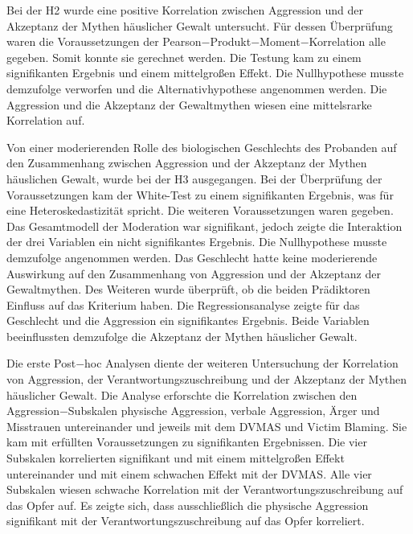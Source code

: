 Bei der H2 wurde eine positive Korrelation zwischen Aggression und der Akzeptanz der Mythen häuslicher Gewalt untersucht. Für dessen Überprüfung waren die Voraussetzungen der Pearson$-$Produkt$-$Moment$-$Korrelation alle gegeben. Somit konnte sie gerechnet werden. Die Testung kam zu einem signifikanten Ergebnis und einem mittelgroßen Effekt. Die Nullhypothese musste demzufolge verworfen und die Alternativhypothese angenommen werden. Die Aggression und die Akzeptanz der Gewaltmythen wiesen eine mittelsrarke Korrelation auf.

Von einer moderierenden Rolle des biologischen Geschlechts des Probanden auf den Zusammenhang zwischen Aggression und der Akzeptanz der Mythen häuslichen Gewalt, wurde bei der H3 ausgegangen. Bei der Überprüfung der Voraussetzungen kam der White-Test zu einem signifikanten Ergebnis, was für eine Heteroskedastizität spricht. Die weiteren Voraussetzungen waren gegeben. Das Gesamtmodell der Moderation war signifikant, jedoch zeigte die Interaktion der drei Variablen ein nicht signifikantes Ergebnis. Die Nullhypothese musste demzufolge angenommen werden. Das Geschlecht hatte keine moderierende Auswirkung auf den Zusammenhang von Aggression und der Akzeptanz der Gewaltmythen. Des Weiteren wurde überprüft, ob die beiden Prädiktoren Einfluss auf das Kriterium haben. Die Regressionsanalyse zeigte für das Geschlecht und die Aggression ein signifikantes Ergebnis. Beide Variablen beeinflussten demzufolge die Akzeptanz der Mythen häuslicher Gewalt.

Die erste Post$-$hoc Analysen diente der weiteren Untersuchung der Korrelation von Aggression, der Verantwortungszuschreibung und der Akzeptanz der Mythen häuslicher Gewalt. Die Analyse erforschte die Korrelation zwischen den Aggression$-$Subskalen physische Aggression, verbale Aggression, Ärger und Misstrauen untereinander und jeweils mit dem DVMAS und Victim Blaming. Sie kam mit erfüllten Voraussetzungen zu signifikanten Ergebnissen. Die vier Subskalen korrelierten signifikant und mit einem mittelgroßen Effekt untereinander und mit einem schwachen Effekt mit der DVMAS. Alle vier Subskalen wiesen schwache Korrelation mit der Verantwortungszuschreibung auf das Opfer auf. Es zeigte sich, dass ausschließlich die physische Aggression signifikant mit der Verantwortungszuschreibung auf das Opfer korreliert.



